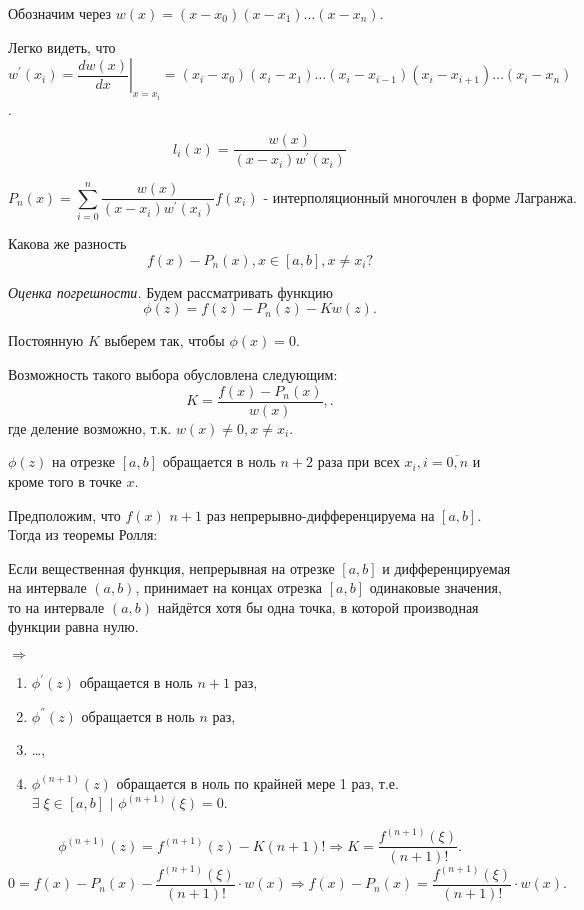 Обозначим через $w(x) = (x - x_0) (x - x_1) \ldots (x - x_n)$.

Легко видеть, что $w^{'}(x_i) = \left.\dfrac{d w(x)}{dx}\right|_{x = x_i} = (x_i - x_0) (x_i - x_1) \ldots (x_i - x_{i - 1}) (x_i - x_{i + 1}) \ldots (x_i - x_n)$.

\begin{equation*}
  l_i(x) = \dfrac{w(x)}{(x - x_i) w^{'} (x_i)}
\end{equation*}

\begin{equation*}
  P_n(x) = \sum\limits_{i=0}^n \dfrac{w(x)}{(x - x_i) w^{'} (x_i)} f(x_i) \text{ - интерполяционный многочлен в форме Лагранжа.}
\end{equation*}

Какова же разность
\begin{equation*}
  f(x) - P_n(x), x \in [a, b], x \ne x_i \text{?}
\end{equation*}

\textit{Оценка погрешности.} \newline
Будем рассматривать функцию
\begin{equation*}
  \phi(z) = f(z) - P_n(z) - K w(z).
\end{equation*}

Постоянную $K$ выберем так, чтобы $\phi(x) = 0$.

Возможность такого выбора обусловлена следующим:
\begin{equation*}
  K = \dfrac{f(x) - P_n(x)}{w(x)},.
\end{equation*}
где деление возможно, т.к. $w(x) \ne 0, x \ne x_i$.

$\phi(z)$ на отрезке $[a, b]$ обращается в ноль $n + 2$ раза при всех $x_i, i = \overline{0, n}$ и кроме того в точке $x$.

Предположим, что $f(x)$ $n+1$ раз непрерывно-дифференцируема на $[a, b]$. Тогда из теоремы Ролля:

\begin{theorem}[Ролля]
  Если вещественная функция, непрерывная на отрезке $[ a , b ]$ и дифференцируемая на интервале $(a,b)$, принимает на концах отрезка $[a,b]$ одинаковые значения, то на интервале $(a, b)$ найдётся хотя бы одна точка, в которой производная функции равна нулю.
\end{theorem} $\Rightarrow$
\begin{enumerate}
  \item $\phi^{'}(z)$ обращается в ноль $n+1$ раз,
  \item $\phi^{''}(z)$ обращается в ноль $n$ раз,
  \item \ldots,
  \item $\phi^{(n+1)}(z)$ обращается в ноль по крайней мере 1 раз, т.е. $\exists \; \xi \in [a,b] \text{ | } \phi^{(n+1)}(\xi) = 0$.
\end{enumerate}

\begin{equation*}
  \phi^{(n+1)}(z) = f^{(n+1)}(z) - K (n + 1)! \Rightarrow K = \dfrac{f^{(n+1)}(\xi)}{(n+1)!}.
\end{equation*}
\begin{equation*}
  0 = f(x) - P_n(x) - \dfrac{f^{(n+1)}(\xi)}{(n+1)!} \cdot w(x) \Rightarrow f(x) - P_n(x) = \dfrac{f^{(n+1)}(\xi)}{(n+1)!} \cdot w(x).
\end{equation*}
